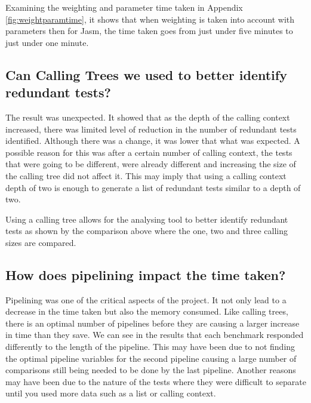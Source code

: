 Examining the weighting and parameter time taken in Appendix \ref{fig:weightparamtime}, it shows that when weighting is taken into account with parameters then for Jasm, the time taken goes from just under five minutes to just under one minute.


\subsection{Can Calling Trees we used to better identify redundant tests?}

The result was unexpected. It showed that as the depth of the calling context increased, there was limited level of reduction in the number of redundant tests identified. Although there was a change, it was lower that what was expected. A possible reason for this was after a certain number of calling context, the tests that were going to be different, were already different and increasing the size of the calling tree did not affect it. This may imply that using a calling context depth of two is enough to generate a list of redundant tests similar to a depth of two. 

Using a calling tree allows for the analysing tool to better identify redundant tests as shown by the comparison above where the one, two and three calling sizes are compared.

\subsection{How does pipelining impact the time taken?}

Pipelining was one of the critical aspects of the project. It not only lead to a decrease in the time taken but also the memory consumed. Like calling trees, there is an optimal number of pipelines before they are causing a larger increase in time than they save. We can see in the results that each  benchmark responded differently to the length of the pipeline. This may have been due to not finding the optimal pipeline variables for the second pipeline causing a large number of comparisons still being needed to be done by the last pipeline. Another reasons may have been due to the nature of the tests where they were difficult to separate until you used more data such as a list or calling context. 

